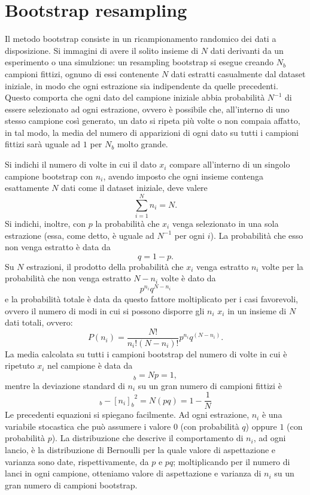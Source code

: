 \documentclass[LaM]{sapthesis}
\begin{document}
	\section{Bootstrap resampling}
	Il metodo bootstrap consiste in un ricampionamento randomico dei dati a disposizione. Si immagini di avere il solito insieme di $N$ dati derivanti da un esperimento o una simulzione: un resampling bootstrap si esegue creando $N_b$ campioni fittizi, ognuno di essi contenente $N$ dati estratti casualmente dal dataset iniziale, in modo che ogni estrazione sia indipendente da quelle precedenti. Questo comporta che ogni dato del campione iniziale abbia probabilità $N^{-1}$ di essere selezionato ad ogni estrazione, ovvero è possibile che, all'interno di uno stesso campione così generato, un dato si ripeta più volte o non compaia affatto, in tal modo, la media del numero di apparizioni di ogni dato su tutti i campioni fittizi sarà uguale ad $1$ per $N_b$ molto grande.
	
	Si indichi il numero di volte in cui il dato $x_i$ compare all'interno di un singolo campione bootstrap con $n_i$, avendo imposto che ogni insieme contenga esattamente $N$ dati come il dataset iniziale, deve valere
	\begin{equation}
		\sum_{i=1}^{N}n_i=N.
	\end{equation}
	Si indichi, inoltre, con $p$ la probabilità che $x_i$ venga selezionato in una sola estrazione (essa, come detto, è uguale ad $N^{-1}$ per ogni $i$). La probabilità che esso non venga estratto è data da
	\begin{equation*}
		q=1-p.
	\end{equation*} 
	Su $N$ estrazioni, il prodotto della probabilità che $x_i$ venga estratto $n_i$ volte per la probabilità che non venga estratto $N-n_i$ volte è dato da
	\begin{equation*}
		p^{n_i}q^{N-n_i}
	\end{equation*}
	e la probabilità totale è data da questo fattore moltiplicato per i casi favorevoli, ovvero il numero di modi in cui si possono disporre gli $n_i$ $x_i$ in un insieme di $N$ dati totali, ovvero:
	\begin{equation}
		P(n_i)=\frac{N!}{n_i!(N-n_i)!}p^{n_i}q^{(N-n_i)}.
	\end{equation}
	La media calcolata su tutti i campioni bootstrap del numero di volte in cui è ripetuto $x_i$ nel campione è data da
	\begin{equation}
		[n_i]_b=Np=1,
	\end{equation}
	mentre la deviazione standard di $n_i$ su un gran numero di campioni fittizi è
	\begin{equation}
	[{n_i}^2]_b-{[n_i]_b}^2=N(pq)=1-\frac{1}{N}
	\end{equation}
	Le precedenti equazioni si spiegano facilmente. Ad ogni estrazione, $n_i$ è una variabile stocastica che può assumere i valore $0$ (con probabilità $q$) oppure $1$ (con probabilità $p$). La distribuzione che descrive il comportamento di $n_i$, ad ogni lancio, è la distribuzione di Bernoulli per la quale valore di aspettazione e varianza sono date, rispettivamente, da $p$ e $pq$; moltiplicando per il numero di lanci in ogni campione, otteniamo valore di aspettazione e varianza di $n_i$ su un gran numero di campioni bootstrap.
	
	
\end{document}
